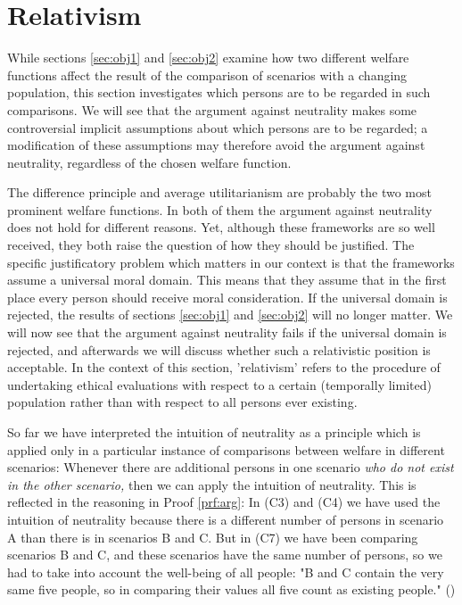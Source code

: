 \section{Relativism}
\label{sec:obj3}

While sections \ref{sec:obj1} and \ref{sec:obj2} examine how two different welfare functions affect the result of the comparison of scenarios with a changing population, this section investigates which persons are to be regarded in such comparisons. We will see that the argument against neutrality makes some controversial implicit assumptions about which persons are to be regarded; a modification of these assumptions may therefore avoid the argument against neutrality, regardless of the chosen welfare function. 

The difference principle and average utilitarianism are probably the two most prominent welfare functions. In both of them the argument against neutrality does not hold for different reasons. Yet, although these frameworks are so well received, they both raise the question of how they should be justified. The specific justificatory problem which matters in our context is that the frameworks assume a universal moral domain. This means that they assume that in the first place every person should receive moral consideration. If the universal domain is rejected, the results of sections \ref{sec:obj1} and \ref{sec:obj2} will no longer matter. We will now see that the argument against neutrality fails if the universal domain is rejected, and afterwards we will discuss whether such a relativistic position is acceptable. In the context of this section, 'relativism' refers to the procedure of undertaking ethical evaluations with respect to a certain (temporally limited) population rather than with respect to all persons ever existing. 

So far we have interpreted the intuition of neutrality as a principle which is applied only in a particular instance of comparisons between welfare in different scenarios: Whenever there are additional persons in one scenario \emph{who do not exist in the other scenario,} then we can apply the intuition of neutrality. This is reflected in the reasoning in Proof \ref{prf:arg}: In (C3) and (C4) we have used the intuition of neutrality because there is a different number of persons in scenario A than there is in scenarios B and C. But in (C7) we have been comparing scenarios B and C, and these scenarios have the same number of persons, so we had to take into account the well-being of all people: "B and C contain the very same five people, so in comparing their values all five count as existing people." () 

